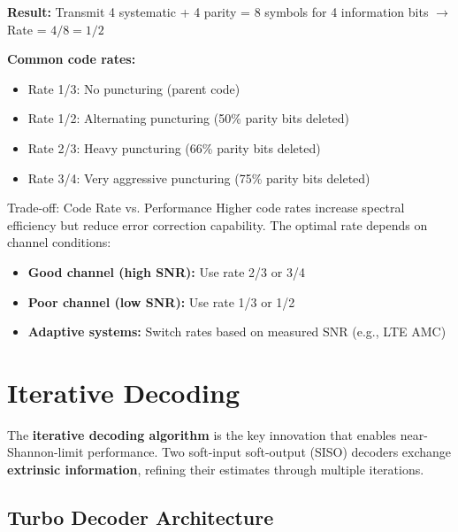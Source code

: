 \textbf{Result:} Transmit 4 systematic + 4 parity = 8 symbols for 4 information bits $\rightarrow$ Rate = $4/8 = 1/2$

\textbf{Common code rates:}
\begin{itemize}
\item Rate 1/3: No puncturing (parent code)
\item Rate 1/2: Alternating puncturing (50\% parity bits deleted)
\item Rate 2/3: Heavy puncturing (66\% parity bits deleted)
\item Rate 3/4: Very aggressive puncturing (75\% parity bits deleted)
\end{itemize}

\begin{calloutbox}{Trade-off: Code Rate vs. Performance}
Higher code rates increase spectral efficiency but reduce error correction capability. The optimal rate depends on channel conditions:
\begin{itemize}
\item \textbf{Good channel (high SNR):} Use rate 2/3 or 3/4
\item \textbf{Poor channel (low SNR):} Use rate 1/3 or 1/2
\item \textbf{Adaptive systems:} Switch rates based on measured SNR (e.g., LTE AMC)
\end{itemize}
\end{calloutbox}

\section{Iterative Decoding}

The \textbf{iterative decoding algorithm} is the key innovation that enables near-Shannon-limit performance. Two soft-input soft-output (SISO) decoders exchange \textbf{extrinsic information}, refining their estimates through multiple iterations.

\subsection{Turbo Decoder Architecture}


